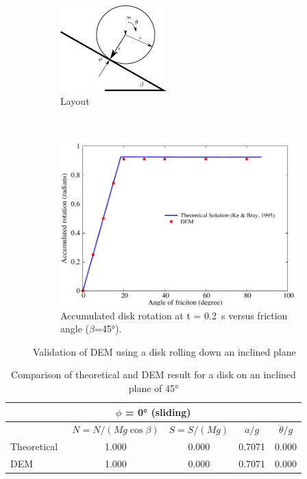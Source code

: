 \begin{figure}[tbhp]
\centering
\begin{subfigure}[b]{0.95\textwidth}
\centering
\includegraphics[width=0.45\textwidth]{rolling}
\caption{Layout}
\label{fig:rolling}
\end{subfigure}
\\
\begin{subfigure}[b]{0.95\textwidth}
\centering
\includegraphics[width=\textwidth]{DEM_Validation}
\caption{Accumulated disk rotation at t = 0.2~\si{\s} versus friction angle 
($\beta$=45\si{\degree}).}
\label{fig:DEM_Validation}
\end{subfigure}
\caption{Validation of DEM using a disk rolling down an inclined plane}
\label{fig:Validation_DEM}
\end{figure}

\begin{table}[tbhp]
\caption{Comparison of theoretical and DEM result for a disk on an inclined 
plane of 45\si{\degree}}
\label{table:dem_validation}
\centering
\begin{tabular}{lcccc}
\toprule
\multicolumn{5}{c}{$\phi$ = 0\si{\degree} (sliding)} \\ \midrule
 & $N=N/(Mg\cos\beta)$ & $S=S/(Mg)$ & $\ddot{a}/g$ & $\ddot{\theta}/g$\\
Theoretical~\citep{Ke1995} & 1.000 & 0.000 & 0.7071 & 0.000 \\
DEM & 1.000 & 0.000 & 0.7071 & 0.000 \\
\bottomrule
\end{tabular}
\end{table}

